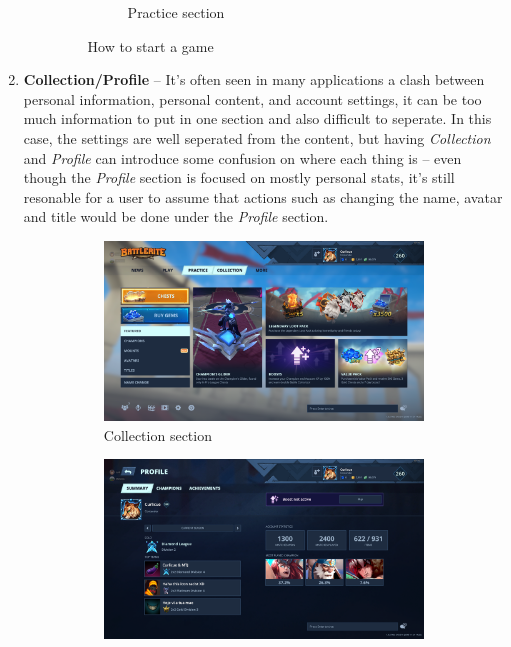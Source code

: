 \documentclass[a4paper,12pt]{article}
\begin{document}
\begin{enumerate}[label=\textbf{\arabic*})]
\begin{itemize}
\begin{figure}[h!]
\begin{subfigure}[b]{0.45\linewidth}
                \caption{Practice section}
            \end{subfigure}
            \caption{How to start a game}
            \label{fig:play_vs_practice}
        \end{figure}
    \end{itemize}
    
    \item \textbf{Collection/Profile} -- It's often seen in many applications a clash between personal information, personal content, and account settings, it can be too much information to put in one section and also difficult to seperate. In this case, the settings are well seperated from the content, but having \textit{Collection} and \textit{Profile} can introduce some confusion on where each thing is -- even though the \textit{Profile} section is focused on mostly personal stats, it's still resonable for a user to assume that actions such as changing the name, avatar and title would be done under the \textit{Profile} section.
    \begin{figure}[h!]
        \centering
        \begin{subfigure}[b]{0.45\linewidth}
            \includegraphics[width=\linewidth]{res/current/collection.png}
            \caption{Collection section}
        \end{subfigure}
        \begin{subfigure}[b]{0.45\linewidth}
            \includegraphics[width=\linewidth]{res/current/profile.png}

\end{subfigure}
\end{figure}
\end{enumerate}
\end{document}
